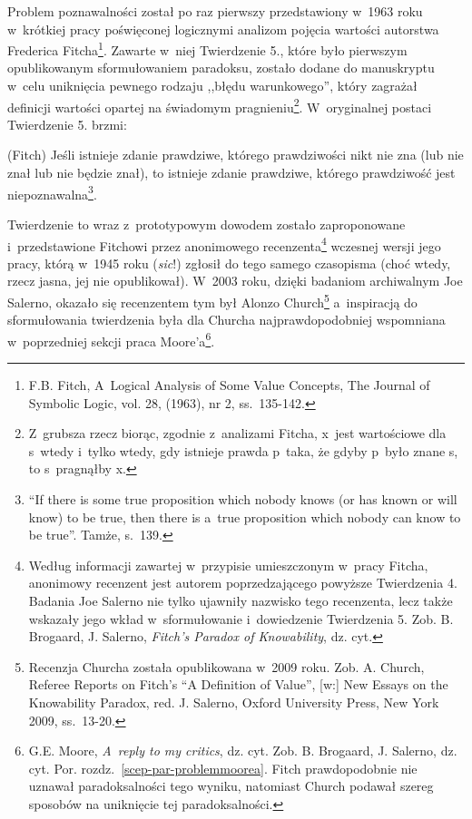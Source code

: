 {Problem poznawalności został po raz pierwszy przedstawiony w~1963 roku w~krótkiej pracy poświęconej logicznymi analizom pojęcia wartości autorstwa Frederica Fitcha\footnote{F.B. Fitch, A~Logical Analysis of Some Value Concepts, The Journal of Symbolic Logic, vol. 28, (1963), nr 2, ss.~135-142.}. Zawarte w~niej Twierdzenie 5., które było pierwszym opublikowanym sformułowaniem paradoksu, zostało dodane do manuskryptu w~celu uniknięcia pewnego rodzaju ,,błędu warunkowego'', który zagrażał definicji wartości opartej na świadomym pragnieniu\footnote{Z~grubsza rzecz biorąc, zgodnie z~analizami Fitcha, x~jest wartościowe dla s~wtedy i~tylko wtedy, gdy istnieje prawda p~taka, że gdyby p~było znane s, to s~pragnąłby x.}. W~oryginalnej postaci Twierdzenie 5. brzmi:

(Fitch) Jeśli istnieje zdanie prawdziwe, którego prawdziwości nikt nie zna (lub nie znał lub nie będzie znał), to istnieje zdanie prawdziwe, którego prawdziwość jest niepoznawalna\footnote{``If there is some true proposition which nobody knows (or has known or will know) to be true, then there is a~true proposition which nobody can know to be true''. Tamże, s.~139.}.\label{scep-par-cf-fitch}

Twierdzenie to wraz z~prototypowym dowodem zostało zaproponowane i~przedstawione Fitchowi przez anonimowego recenzenta\footnote{Według informacji zawartej w~przypisie umieszczonym w~pracy Fitcha, anonimowy recenzent jest autorem poprzedzającego powyższe Twierdzenia 4. Badania Joe Salerno nie tylko ujawniły nazwisko tego recenzenta, lecz także wskazały jego wkład w~sformułowanie i~dowiedzenie Twierdzenia 5. Zob. B. Brogaard, J. Salerno, \textit{Fitch's Paradox of Knowability}, dz. cyt.} wczesnej wersji jego pracy, którą w~1945 roku (\textit{sic}!) zgłosił do tego samego czasopisma (choć wtedy, rzecz jasna, jej nie opublikował). W~2003 roku, dzięki badaniom archiwalnym Joe Salerno, okazało się recenzentem tym był Alonzo Church\footnote{Recenzja Churcha została opublikowana w~2009 roku. Zob. A. Church, Referee Reports on Fitch's ``A Definition of Value'', [w:] New Essays on the Knowability Paradox, red. J. Salerno, Oxford University Press, New York 2009, ss.~13-20.} a~inspiracją do sformułowania twierdzenia była dla Churcha najprawdopodobniej wspomniana w~poprzedniej sekcji praca Moore'a\footnote{G.E. Moore, \textit{A~reply to my critics}, dz. cyt. Zob. B. Brogaard, J. Salerno, dz. cyt. Por. rozdz.~\ref{scep-par-problemmoorea}. Fitch prawdopodobnie nie uznawał paradoksalności tego wyniku, natomiast Church podawał szereg sposobów na uniknięcie tej paradoksalności.}.

}
